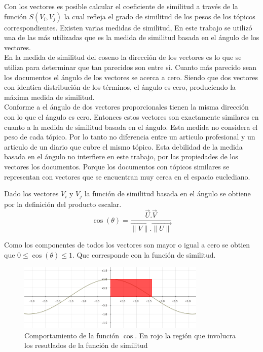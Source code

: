 Con los vectores es posible calcular el coeficiente de similitud a través de la función $ S (V_i, V_j)$ la cual refleja el grado de similitud de los pesos de los tópicos correspondientes. Existen varias medidas de similitud, En este trabajo se utilizó una de las más utilizadas que es la medida de similitud basada en el ángulo de los vectores.\\
En la medida de similitud del coseno la dirección de los vectores es lo que se utiliza para determinar que tan parecidos son entre si. Cuanto más parecido sean los documentos el ángulo de los vectores se acerca a cero. Siendo que dos vectores con identica distribución de los términos, el ángulo es cero, produciendo la máxima medida de similitud.\\
Conforme a \cite{newSimilarity} el ángulo de dos vectores proporcionales tienen la misma dirección con lo que el ángulo es cero. Entonces estos vectores son exactamente similares en cuanto a la medida de similitud basada en el ángulo. Esta medida no considera el peso de cada tópico. Por lo tanto no diferencia entre un articulo profesional y un articulo de un diario que cubre el mismo tópico. Esta debilidad de la medida basada en el ángulo no interfiere en este trabajo, por las propiedades de los vectores los documentos. Porque los documentos con tópicos similares se representan con vectores que se encuentran muy cerca en el espacio euclediano.

Dado los vectores $V_i$ y $V_j$ la función de similitud basada en el ángulo se obtiene por la definición del producto escalar.\\
\begin{equation} \label{eq:angulovectorial}
\cos(\theta) =  \dfrac{\overrightarrow{U} . \overrightarrow{V}}{\overrightarrow{\lVert V\lVert}.\overrightarrow{\lVert U\lVert}}
\end{equation}

Como los componentes de todos los vectores son mayor o igual a cero se obtien que $0\leq\cos(\theta)\leq1$. Que corresponde con la función de similitud.

\begin{figure}[H]
\includegraphics[width=0.8\textwidth]{img/coseno.png}
\caption{Comportamiento de la función $\cos$. En rojo la región que involucra los resutlados de la función de similitud}
\label{bus:img-coseno}
\end{figure}


